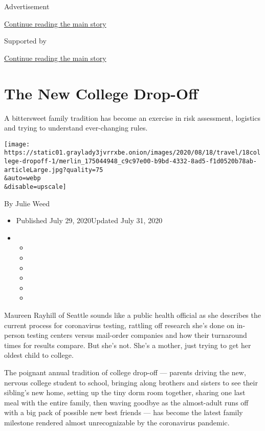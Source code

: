 Advertisement

\protect\hyperlink{after-top}{Continue reading the main story}

Supported by

\protect\hyperlink{after-sponsor}{Continue reading the main story}

\hypertarget{the-new-college-drop-off}{%
\section{The New College Drop-Off}\label{the-new-college-drop-off}}

A bittersweet family tradition has become an exercise in risk
assessment, logistics and trying to understand ever-changing rules.

\texttt{[image: https://static01.graylady3jvrrxbe.onion/images/2020/08/18/travel/18college-dropoff-1/merlin\_175044948\_c9c97e00-b9bd-4332-8ad5-f1d0520b78ab-articleLarge.jpg?quality=75\\\&auto=webp\\\&disable=upscale]}

By Julie Weed

\begin{itemize}
\item
  Published July 29, 2020Updated July 31, 2020
\item
  \begin{itemize}
  \item
  \item
  \item
  \item
  \item
  \item
  \end{itemize}
\end{itemize}

Maureen Rayhill of Seattle sounds like a public health official as she
describes the current process for coronavirus testing, rattling off
research she's done on in-person testing centers versus mail-order
companies and how their turnaround times for results compare. But she's
not. She's a mother, just trying to get her oldest child to college.

The poignant annual tradition of college drop-off --- parents driving
the new, nervous college student to school, bringing along brothers and
sisters to see their sibling's new home, setting up the tiny dorm room
together, sharing one last meal with the entire family, then waving
goodbye as the almost-adult runs off with a big pack of possible new
best friends --- has become the latest family milestone rendered almost
unrecognizable by the coronavirus pandemic.

